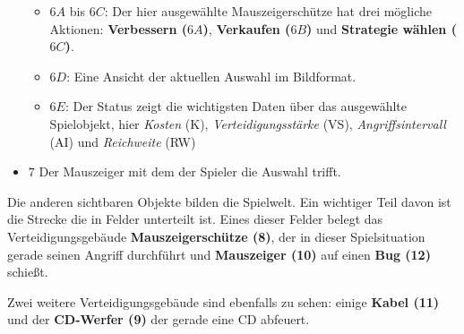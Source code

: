 \begin{itemize}[leftmargin=*]
\begin{itemize}
		\item{$6 A$ bis $6 C$: Der hier ausgewählte Mauszeigerschütze hat drei mögliche Aktionen: \textbf{Verbessern ($6 A$)}, \textbf{Verkaufen ($6 B$)} und \textbf{Strategie wählen ($6 C$)}.}
		\item{$6 D$: Eine Ansicht der aktuellen Auswahl im Bildformat.}
		\item{$6 E$: Der Status zeigt die wichtigsten Daten über das ausgewählte Spielobjekt, hier \textit{Kosten} (K), \textit{Verteidigungsstärke} (VS), \textit{Angriffsintervall }(AI) und \textit{Reichweite} (RW)}
	\end{itemize}
	\item {$7$ Der Mauszeiger mit dem der Spieler die Auswahl trifft.}
\end{itemize}
Die anderen sichtbaren Objekte bilden die Spielwelt. Ein wichtiger Teil davon ist die Strecke die in Felder unterteilt ist. Eines dieser Felder belegt das Verteidigungsgebäude \textbf{Mauszeigerschütze (8)}, der in dieser Spielsituation gerade seinen Angriff durchführt und \textbf{Mauszeiger (10)} auf einen \textbf{Bug (12)} schießt.

Zwei weitere Verteidigungsgebäude sind ebenfalls zu sehen: einige \textbf{Kabel (11)} und der \textbf{CD-Werfer (9)} der gerade eine CD abfeuert.
